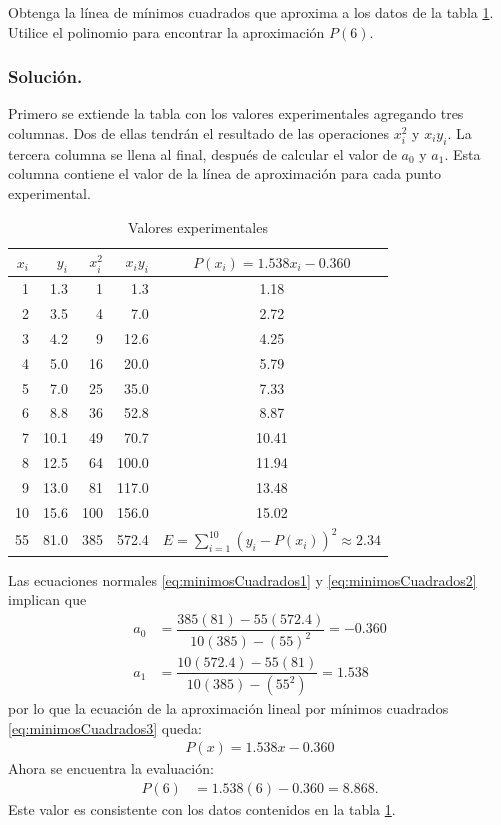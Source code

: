 \begin{exerciseT}
	Obtenga la línea de mínimos cuadrados que aproxima a los datos de la tabla \ref{table:ejemplo1MinimosCuadradosLineales}.
	Utilice el polinomio para encontrar la aproximación $P(6)$.
	\subsubsection*{Solución.} 
	Primero se extiende la tabla con los valores experimentales agregando tres columnas. Dos de ellas tendrán
	el resultado de las operaciones $x_i^2$ y $x_iy_i$. La tercera columna se llena al final, después de calcular el valor de $a_0$
	y $a_1$. Esta columna contiene el valor de la línea de aproximación para cada punto experimental.
	\begin{table}[H]
		\centering
      	\begin{tabular}{rrrrc}
			\toprule
			$x_i$ & $y_i$ & $x_i^2$ & $x_iy_i$ & $P(x_i) = 1.538x_i - 0.360$\\\midrule
			1 & 1.3 & 1 & 1.3 & 1.18\\
			2 & 3.5 & 4 & 7.0 & 2.72\\
			3 & 4.2 & 9 & 12.6 & 4.25\\
			4 & 5.0 & 16 & 20.0 & 5.79\\
			5 & 7.0 & 25 & 35.0 & 7.33\\
			6 & 8.8 & 36 & 52.8 & 8.87\\
			7 & 10.1 & 49 & 70.7 & 10.41\\
			8 & 12.5 & 64 & 100.0 & 11.94\\
			9 & 13.0 & 81 & 117.0 & 13.48\\
			10 & 15.6 & 100 & 156.0 & 15.02\\
			\bottomrule
			55 & 81.0 & 385 & 572.4 & $E=\sum_{i=1}^{10} (y_i-P(x_i))^2 \approx 2.34$
		\end{tabular}
		\label{table:ejemplo1MinimosCuadradosLineales}
		\caption{Valores experimentales}
	\end{table} 	
	
	Las ecuaciones normales \ref{eq:minimosCuadrados1} y \ref{eq:minimosCuadrados2} implican que
	\begin{align*}
		a_0 &= \dfrac{385(81) - 55(572.4)}{10(385) - (55)^2} = -0.360 \\
		a_1 &= \dfrac{10(572.4) - 55(81)}{10(385) - (55^2)} = 1.538
	\end{align*}
	por lo que la ecuación de la aproximación lineal por mínimos cuadrados \ref{eq:minimosCuadrados3} queda:
	\begin{align*}
		P(x)= 1.538x - 0.360
	\end{align*}
	Ahora se encuentra la evaluación:
	\begin{align*}
		P(6) &= 1.538(6) - 0.360 = 8.868.
	\end{align*}
	Este valor es consistente con los datos contenidos en la tabla \ref{table:ejemplo1MinimosCuadradosLineales}.
\end{exerciseT}

